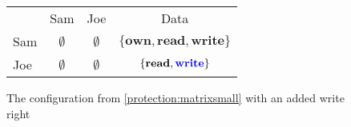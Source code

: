 \begin{figure}
\centering
\begin{tabular}{l|c|c|c|}
\multicolumn{1}{c}{} & \multicolumn{1}{c}{Sam} & \multicolumn{1}{c}{Joe} & \multicolumn{1}{c}{Data} \\\cline{2-4}
Sam & $\emptyset$ & $\emptyset$ & $\{\textbf{own}, \textbf{read}, \textbf{write}\}$ \\\cline{2-4}
Joe & $\emptyset$ & $\emptyset$ & $\{\textbf{read}, {\color{blue}\textbf{write}}\}$ \\\cline{2-4}
\end{tabular}
\caption{The configuration from \cref{protection:matrixsmall} with an added write right}
\label{protection:matrixwithwrite}
\end{figure}
